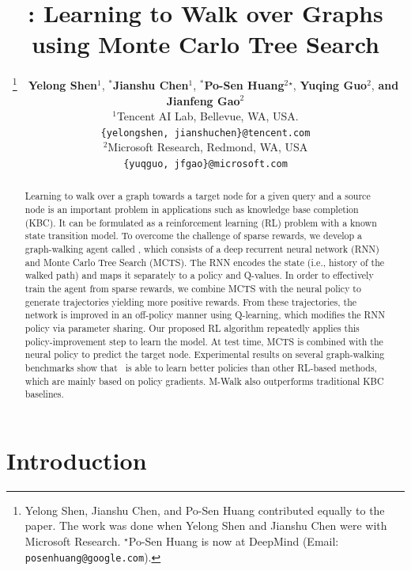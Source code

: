 \documentclass{article}
\title{\modelname: Learning to Walk over Graphs\\ using Monte Carlo Tree Search}
\author{
\thanks{Yelong Shen, Jianshu Chen, and Po-Sen Huang contributed equally to the paper. The work was done when Yelong Shen and Jianshu Chen were with Microsoft Research. $^\star$Po-Sen Huang is now at DeepMind (Email: \texttt{posenhuang@google.com}).}~~{\bf Yelong Shen}$^1$,
$^*${\bf Jianshu Chen}$^1$, 
$^*${\bf Po-Sen Huang}$^2$$^\star$,
{\bf Yuqing Guo}$^2$,
{\bf and Jianfeng Gao}$^2$ \\
$^1$Tencent AI Lab, Bellevue, WA, USA. \\
\texttt{\{yelongshen, jianshuchen\}@tencent.com}  \\
$^2$Microsoft Research, Redmond, WA, USA \\
\texttt{\{yuqguo, jfgao\}@microsoft.com}
}
\begin{document}
\maketitle
		
\begin{abstract}
Learning to walk over a graph towards a target node for a given query and a source node is an important problem in applications such as knowledge base completion (KBC). It can be formulated as a reinforcement learning (RL) problem with a known state transition model. To overcome the challenge of sparse rewards, we develop a graph-walking agent called \modelname, which consists of a deep recurrent neural network (RNN) and Monte Carlo Tree Search (MCTS). The RNN encodes the state (i.e., history of the walked path) and maps it separately to a policy and Q-values. In order to effectively train the agent from sparse rewards, we combine MCTS with the neural policy to generate trajectories yielding more positive rewards. From these trajectories, the network is improved in an off-policy manner using Q-learning, which modifies the RNN policy via parameter sharing. Our proposed RL algorithm repeatedly applies this policy-improvement step to learn the model. At test time, MCTS is combined with the neural policy to predict the target node. Experimental results on several graph-walking benchmarks show that \modelname~is able to learn better policies than other RL-based methods, which are mainly based on policy gradients. M-Walk also outperforms traditional KBC baselines.
\end{abstract}
	
	
	\section{Introduction}
	
\end{document}
